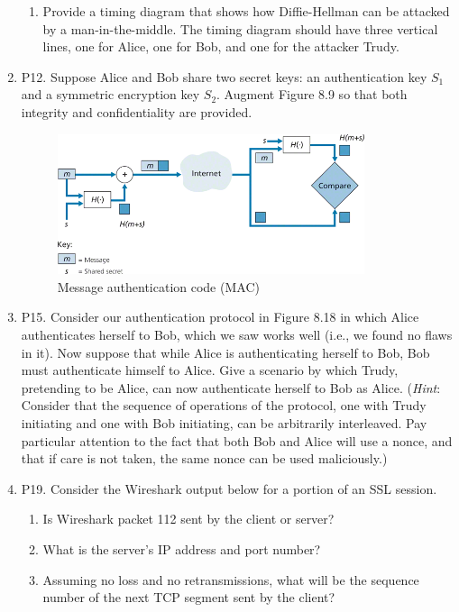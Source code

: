 \documentclass[12pt]{article}
\begin{document}
\begin{enumerate}
\begin{enumerate}
			\item Provide a timing diagram that shows how Diffie-Hellman can be attacked by a man-in-the-middle. The timing diagram should have three vertical lines, one for Alice, one for Bob, and one for the attacker Trudy.
		\end{enumerate}
	\item P12. Suppose Alice and Bob share two secret keys: an authentication key \(S_1\) and a symmetric encryption key \(S_2\). Augment Figure 8.9 so that both integrity and confidentiality are provided.
	\setcounter{figure}{8}
	\begin{figure}[h!]
	\centering
	\includegraphics[width=0.85\textwidth]{./Images/Fig08-009.png}
	\caption{Message authentication code (MAC)}
	\end{figure}
	\item P15. Consider our authentication protocol in Figure 8.18 in which Alice authenticates herself to Bob, which we saw works well (i.e., we found no flaws in it). Now suppose that while Alice is authenticating herself to Bob, Bob must authenticate himself to Alice. Give a scenario by which Trudy, pretending to be Alice, can now authenticate herself to Bob as Alice. (\textit{Hint}: Consider that the sequence of operations of the protocol, one with Trudy initiating and one with Bob initiating, can be arbitrarily interleaved. Pay particular attention to the fact that both Bob and Alice will use a nonce, and that if care is not taken, the same nonce can be used maliciously.)
	\item P19. Consider the Wireshark output below for a portion of an SSL session.
	\begin{enumerate}
		\item Is Wireshark packet 112 sent by the client or server?
		\item What is the server’s IP address and port number?
		\item Assuming no loss and no retransmissions, what will be the sequence number of the next TCP segment sent by the client?

\end{enumerate}
\end{enumerate}
\end{document}
